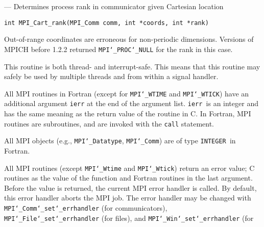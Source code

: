 \startmanpage
{}
--- Determines process rank in communicator given Cartesian location 
\startvb\begin{verbatim}
int MPI_Cart_rank(MPI_Comm comm, int *coords, int *rank)

\end{verbatim}
\endvb

\par
{}
\par
{}
Out-of-range coordinates are erroneous for non-periodic dimensions.
Versions of MPICH before 1.2.2 returned {\tt MPI{\tt \char`\_}PROC{\tt \char`\_}NULL} for the rank in this
case.
\par
{}
\par
This routine is both thread- and interrupt-safe.
This means that this routine may safely be used by multiple threads and
from within a signal handler.
\par
{}
All MPI routines in Fortran (except for {\tt MPI{\tt \char`\_}WTIME} and {\tt MPI{\tt \char`\_}WTICK}) have
an additional argument {\tt ierr} at the end of the argument list.  {\tt ierr
}is an integer and has the same meaning as the return value of the routine
in C.  In Fortran, MPI routines are subroutines, and are invoked with the
{\tt call} statement.
\par
All MPI objects (e.g., {\tt MPI{\tt \char`\_}Datatype}, {\tt MPI{\tt \char`\_}Comm}) are of type {\tt INTEGER
}in Fortran.
\par
{}
\par
All MPI routines (except {\tt MPI{\tt \char`\_}Wtime} and {\tt MPI{\tt \char`\_}Wtick}) return an error value;
C routines as the value of the function and Fortran routines in the last
argument.  Before the value is returned, the current MPI error handler is
called.  By default, this error handler aborts the MPI job.  The error handler
may be changed with {\tt MPI{\tt \char`\_}Comm{\tt \char`\_}set{\tt \char`\_}errhandler} (for communicators),
{\tt MPI{\tt \char`\_}File{\tt \char`\_}set{\tt \char`\_}errhandler} (for files), and {\tt MPI{\tt \char`\_}Win{\tt \char`\_}set{\tt \char`\_}errhandler} (for
